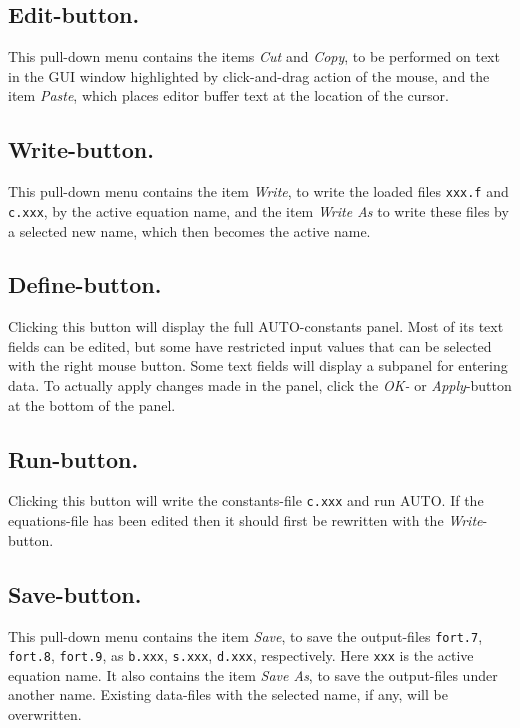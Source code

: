 \documentclass[12pt]{report}
\begin{document}
\subsection{ Edit-button.}
This pull-down menu contains the items
{\it Cut} and {\it Copy}, 
to be performed on text in the GUI window
highlighted by click-and-drag action of the mouse,
and the item {\it Paste}, which places editor buffer text at the
location of the cursor.



\subsection{ Write-button.}
This pull-down menu contains the item
{\it Write},
to write the loaded files {\tt xxx.f} and {\tt c.xxx},
by the active equation name,
and the item
{\it Write As}
to write these files by a selected new name, which then becomes the active name.


\subsection{ Define-button.}
Clicking this button will display the full {\cal AUTO}-constants panel.
Most of its text fields can be edited,
but some have restricted input values that can be selected with
the right mouse button.
Some text fields will display a subpanel for entering data.
To actually apply changes made in the panel, click the
{\it OK-} or {\it Apply}-button at the bottom of the panel.



\subsection{ Run-button.}
Clicking this button will write the constants-file {\tt c.xxx} and run {\cal AUTO}.
If the equations-file has been edited then it should first be rewritten 
with the {\it Write}-button. 


\subsection{ Save-button.}
This pull-down menu contains the item
{\it Save},
to save the output-files {\tt fort.7}, {\tt fort.8}, {\tt fort.9},
as {\tt b.xxx}, {\tt s.xxx}, {\tt d.xxx}, respectively.
Here {\tt xxx} is the active equation name.
It also contains the item
{\it Save As}, 
to save the output-files under another name. 
Existing data-files with the selected name, if any, will be overwritten.
\end{document}
